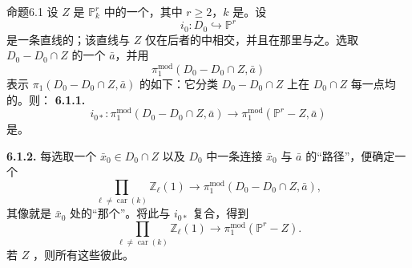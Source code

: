 \begin{SGAresult}{命题}{6.1}
设 $Z$ 是 $\mathbb P_k^r$ 中的一个，其中 $r\geq2$，$k$ 是。设
\[
i_0:D_0\hookrightarrow\mathbb P^r
\]
是一条直线的；该直线与 $Z$ 仅在后者的中相交，并且在那里与之。选取 $D_0-D_0\cap Z$ 的一个 $\bar a$，并用
\[
\pi_1^{\mathrm{mod}}(D_0-D_0\cap Z,\bar a)
\]
表示 $\pi_1(D_0-D_0\cap Z,\bar a)$ 的如下：它分类 $D_0-D_0\cap Z$ 上在 $D_0\cap Z$ 每一点均的。则：
\textbf{6.1.1.} 
\[
i_{0*}:\pi_1^{\mathrm{mod}}(D_0-D_0\cap Z,\bar a)
\longrightarrow\pi_1^{\mathrm{mod}}(\mathbb P^r-Z,\bar a)
\tag{6.1.1.1}
\]
是。

\textbf{6.1.2.} 每选取一个 $\bar x_0\in D_0\cap Z$ 以及 $D_0$ 中一条连接 $\bar x_0$ 与 $\bar a$ 的“路径”，便确定一个
\[
\prod_{\ell\neq\operatorname{car}(k)}\mathbb Z_\ell(1)
\longrightarrow\pi_1^{\mathrm{mod}}(D_0-D_0\cap Z,\bar a),
\tag{6.1.2.1}
\]
其像就是 $\bar x_0$ 处的“那个”。将此与 $i_{0*}$ 复合，得到
\[
\prod_{\ell\neq\operatorname{car}(k)}\mathbb Z_\ell(1)
\longrightarrow\pi_1^{\mathrm{mod}}(\mathbb P^r-Z).
\tag{6.1.2.2}
\]
若 $Z$ ，则所有这些彼此。
\end{SGAresult}
